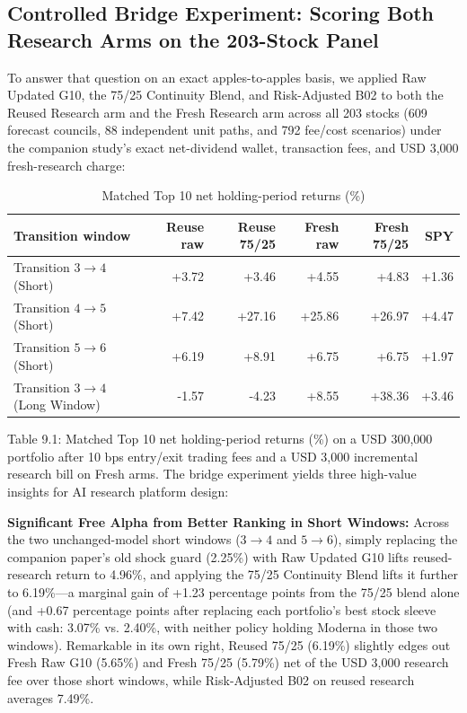 \documentclass[11pt,a4paper]{article}
\numberwithin{table}{section}
\begin{document}
\subsection{Controlled Bridge Experiment: Scoring Both Research Arms on the 203-Stock Panel}

To answer that question on an exact apples-to-apples basis, we applied Raw Updated G10, the 75/25 Continuity Blend, and Risk-Adjusted B02 to both the Reused Research arm and the Fresh Research arm across all 203 stocks (609 forecast councils, 88 independent unit paths, and 792 fee/cost scenarios) under the companion study's exact net-dividend wallet, transaction fees, and USD 3,000 fresh-research charge:

\begin{minipage}{\linewidth}
\begin{center}\small\setlength{\tabcolsep}{3pt}\renewcommand{\arraystretch}{1.18}
\begin{longtable}{@{}lrrrrr@{}}
\caption{Matched Top 10 net holding-period returns (\%)}\\
\toprule
Transition window & Reuse raw & Reuse 75/25 & Fresh raw & Fresh 75/25 & SPY\\\midrule\endhead
Transition $3\to 4$ (Short) & +3.72 & +3.46 & +4.55 & +4.83 & +1.36\\
Transition $4\to 5$ (Short) & +7.42 & +27.16 & +25.86 & +26.97 & +4.47\\
Transition $5\to 6$ (Short) & +6.19 & +8.91 & +6.75 & +6.75 & +1.97\\
Transition $3\to 4$ (Long Window) & -1.57 & -4.23 & +8.55 & +38.36 & +3.46\\
\bottomrule\end{longtable}\end{center}
\end{minipage}\par
Table 9.1: Matched Top 10 net holding-period returns (\%) on a USD 300,000 portfolio after 10 bps entry/exit trading fees and a USD 3,000 incremental research bill on Fresh arms. The bridge experiment yields three high-value insights for AI research platform design:

\textbf{Significant Free Alpha from Better Ranking in Short Windows:} Across the two unchanged-model short windows ($3\to 4$ and $5\to 6$), simply replacing the companion paper's old shock guard (2.25\%) with Raw Updated G10 lifts reused-research return to 4.96\%, and applying the 75/25 Continuity Blend lifts it further to 6.19\%---a marginal gain of +1.23 percentage points from the 75/25 blend alone (and +0.67 percentage points after replacing each portfolio's best stock sleeve with cash: 3.07\% vs. 2.40\%, with neither policy holding Moderna in those two windows). Remarkable in its own right, Reused 75/25 (6.19\%) slightly edges out Fresh Raw G10 (5.65\%) and Fresh 75/25 (5.79\%) net of the USD 3,000 research fee over those short windows, while Risk-Adjusted B02 on reused research averages 7.49\%.
\end{document}
